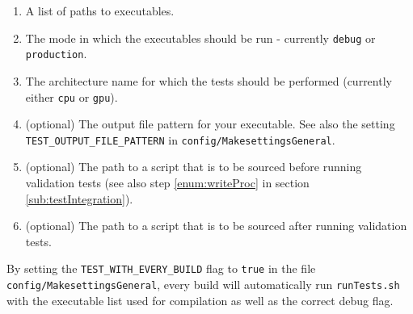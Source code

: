 \begin{description}
\begin{enumerate}
   \item A list of paths to executables.
   \item The mode in which the executables should be run - currently \verb|debug| or \verb|production|.
   \item The architecture name for which the tests should be performed (currently either \verb|cpu| or \verb|gpu|).
   \item (optional) The output file pattern for your executable. See also the setting \verb|TEST_OUTPUT_FILE_PATTERN| in \verb|config/MakesettingsGeneral|.
   \item (optional) The path to a script that is to be sourced before running validation tests (see also step \ref{enum:writeProc} in section \ref{sub:testIntegration}).
   \item (optional) The path to a script that is to be sourced after running validation tests.
  \end{enumerate}
  By setting the \verb|TEST_WITH_EVERY_BUILD| flag to \verb|true| in the file \verb|config/MakesettingsGeneral|, every build will automatically run \verb|runTests.sh| with the executable list used for compilation as well as the correct debug flag.
\end{description}

